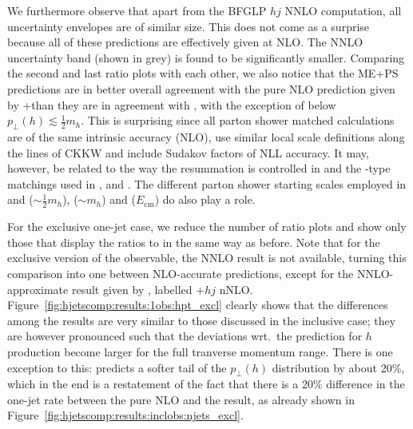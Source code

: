 We furthermore observe that apart from the BFGLP $hj$ NNLO computation,
all uncertainty envelopes are of similar size. This does not come as
a surprise because all of these predictions are effectively given at
NLO. The NNLO uncertainty band (shown in grey) is found to be
significantly smaller. Comparing the second and last ratio plots with
each other, we also notice that the ME+PS predictions are in better
overall agreement with the pure NLO prediction given by
\hjetscompGoSam{}+\hjetscompSherpa than they are in agreement with \hjetscompPowheg, with the
exception of \hjetscompMGaMC below $p_\perp(h)\lesssim\tfrac{1}{2}m_h$. This is
surprising since all parton shower matched calculations are of the
same intrinsic accuracy (NLO), use similar local scale definitions
along the lines of CKKW and include Sudakov factors of NLL accuracy.
It may, however, be related to the way the resummation is controlled
in \hjetscompPowheg and the \hjetscompMCatNLO-type matchings used in \hjetscompMGaMC, \hjetscompHerwig and
\hjetscompSherpa. The different parton shower starting scales employed in
\hjetscompHerwig and \hjetscompSherpa ($\sim\tfrac{1}{2}m_h$), \hjetscompMGaMC ($\sim m_h$) and
\hjetscompPowheg ($E_\mathrm{cm}$) do also play a role.

For the exclusive one-jet case, we reduce the number of ratio plots
and show only those that display the ratios to \hjetscompPowheg in the same way
as before. Note that for the exclusive version of the observable, the
NNLO result is not available, turning this comparison into one between
NLO-accurate predictions, except for the NNLO-approximate result given
by \hjetscompLoopsim, labelled \hjetscompGoSam{}+\hjetscompSherpa $hj$ nNLO.
Figure~\ref{fig:hjetscomp:results:1obs:hpt_excl} clearly shows that
the differences among the results are very similar to those discussed
in the inclusive case; they are however pronounced such that the
deviations wrt.~the \hjetscompPowheg \hjetscompNNLOPS prediction for $h$ production
become larger for the full tranverse momentum range. There is one
exception to this: \hjetscompLoopsim predicts a softer tail of the $p_\perp(h)$
distribution by about 20\%, which in the end is a restatement of the
fact that there is a 20\% difference in the one-jet rate between the
pure NLO and the \hjetscompLoopsim result, as already shown in
Figure~\ref{fig:hjetscomp:results:inclobs:njets_excl}.

